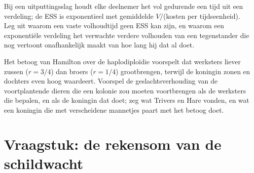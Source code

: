 \begin{exercise}[$\star\star\star$]\label{exo:b3:behavioural-ecology:11}
Bij een uitputtingsslag houdt elke deelnemer het vol gedurende een tijd
uit een verdeling; de ESS is exponentieel met gemiddelde $V/$(kosten
per tijdseenheid). Leg uit waarom een vaste volhoudtijd geen ESS kan
zijn, en waarom een exponentiële verdeling het verwachte verdere
volhouden van een tegenstander die nog vertoont onafhankelijk maakt van
hoe lang hij dat al doet.
\end{exercise}

\begin{exercise}[$\star\star\star$]\label{exo:b3:behavioural-ecology:12}
Het betoog van Hamilton over de haplodiploïdie voorspelt dat werksters
liever zussen ($r = 3/4$) dan broers ($r = 1/4$) grootbrengen, terwijl
de koningin zonen en dochters even hoog waardeert. Voorspel de
geslachtsverhouding van de voortplantende dieren die een kolonie zou
moeten voortbrengen als de werksters die bepalen, en als de koningin
dat doet; zeg wat Trivers en Hare vonden, en wat een koningin die met
verscheidene mannetjes paart met het betoog doet.
\end{exercise}

\section{Vraagstuk: de rekensom van de schildwacht}

